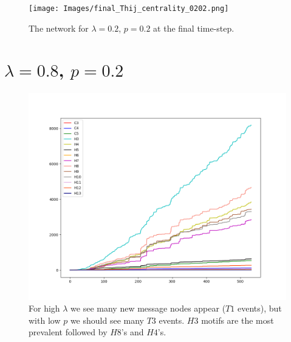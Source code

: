 \begin{figure}[h!]
    \texttt{[image: Images/final\_Thij\_centrality\_0202.png]}
    \centering
    \caption{The network for $\lambda=0.2$, $p=0.2$ at the final time-step.}
\end{figure}

\clearpage

\section{$\lambda=0.8$, $p=0.2$}

\begin{figure}[h!]
    \includegraphics[width=16cm]{Images/twitter_sim_for_stats_3_0.8_0.2.png}
    \centering
    \caption{For high $\lambda$ we see many new message nodes appear ($T1$ events), but
    with low $p$ we should see many $T3$ events. $H3$ motifs are the most prevalent
    followed by $H8$'s and $H4$'s.}
    \label{fig:thij0802}
\end{figure}

